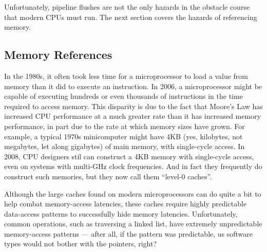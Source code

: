 Unfortunately, pipeline flushes are not the only hazards in the obstacle
course that modern CPUs must run.
The next section covers the hazards of referencing memory.

\subsection{Memory References}
\label{sec:cpu:Memory References}

In the 1980s, it often took less time for a microprocessor to load a value
from memory than it did to execute an instruction.
In 2006, a microprocessor might be capable of executing hundreds or even
thousands of instructions in the time required to access memory.
This disparity is due to the fact that Moore's Law has increased CPU
performance at a much greater rate than it has increased memory
performance, in part due to the rate at which memory sizes have
grown.
For example, a typical 1970s minicomputer might have 4KB (yes, kilobytes,
not megabytes, let along gigabytes) of main memory, with single-cycle access.
In 2008, CPU designers stil can construct a 4KB memory with single-cycle
access, even on systems with multi-GHz clock frequencies.
And in fact they frequently do construct such memories, but they now
call them ``level-0 caches''.

Although the large caches found on modern microprocessors can do quite
a bit to help combat memory-access latencies,
these caches require highly predictable data-access patterns to
successfully hide memory latencies.
Unfortunately, common operations, such as traversing a linked list,
have extremely unpredictable memory-access patterns --- after all,
if the pattern was predictable, us software types would not bother
with the pointers, right?

